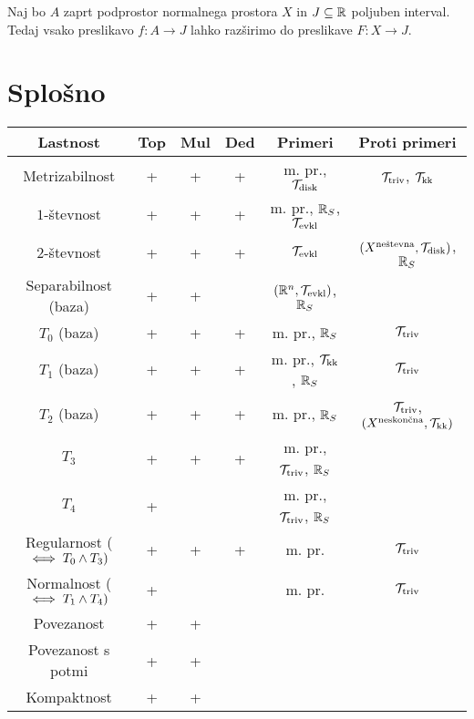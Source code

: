 \begin{izrek}
    Naj bo $A$ zaprt podprostor normalnega prostora $X$ in $J \subseteq \mathbb{R}$ poljuben interval. Tedaj vsako preslikavo $f: A \to J$ lahko razširimo do preslikave $F: X \to J$.
\end{izrek}



\section{Splošno}

\begin{center}
    \begin{tabular}{ |c| c |c| c| c| c | }
    \hline
     Lastnost & Top & Mul & Ded & Primeri & Proti primeri\\ \hline
     Metrizabilnost & + & + & + & m. pr., $\mathcal{T}_{\text{disk}}$ & $\mathcal{T}_{\text{triv}}$, $\mathcal{T}_\text{kk}$ \\ \hline
     $1$-števnost & + & + & + & m. pr., $\mathbb{R}_S$, $\mathcal{T}_{\text{evkl}}$ &  \\ \hline
     $2$-števnost & + & + & + & $\mathcal{T}_{\text{evkl}}$ & $(X^\text{neštevna}, \mathcal{T}_{\text{disk}})$, $\mathbb{R}_S$ \\ \hline
     Separabilnost (baza) & + & + &  & $(\mathbb{R}^n, \mathcal{T}_{\text{evkl}})$, $\mathbb{R}_S$ & \\ \hline  
     $T_0$ (baza) & + & + & + & m. pr., $\mathbb{R}_S$ & $\mathcal{T}_{\text{triv}}$ \\ \hline
     $T_1$ (baza) & + & + & + & m. pr., $\mathcal{T}_{\text{kk}}$, $\mathbb{R}_S$ & $\mathcal{T}_{\text{triv}}$ \\ \hline
     $T_2$ (baza) & + & + & + & m. pr., $\mathbb{R}_S$ & $\mathcal{T}_{\text{triv}}$, $(X^\text{neskončna}, \mathcal{T}_{\text{kk}})$ \\ \hline
     $T_3$ & + & + & + & m. pr., $\mathcal{T}_{\text{triv}}$, $\mathbb{R}_S$ &   \\ \hline
     $T_4$ & + & &  & m. pr., $\mathcal{T}_{\text{triv}}$, $\mathbb{R}_S$ &  \\ \hline
     Regularnost (\(\iff T_0 \land T_3)\) & + & + & + & m. pr. & $\mathcal{T}_{\text{triv}}$ \\ \hline
     Normalnost (\(\iff T_1 \land T_4)\)& + & &  & m. pr. & $\mathcal{T}_{\text{triv}}$ \\ \hline
     Povezanost & + & + & & & \\ \hline
     Povezanost s potmi & + & + & & & \\ \hline
     Kompaktnost & + & + & & & \\ \hline
    \end{tabular}
\end{center}

